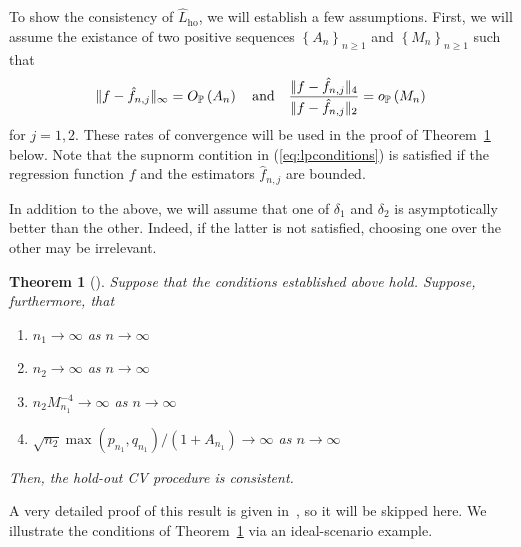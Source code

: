 \documentclass[11pt, letter paper]{article}
\newcommand{\1}{\mathmybb{1}}
\newtheorem{theorem}[proposition]{Theorem}
\newcommand{\0}{\emptyset}
\newcommand{\prob}{\mathbb{P}}
\newcommand{\paren}[1]{\left(#1 \right)}
\newcommand{\set}[1]{\left\{ #1 \right\}}
\newcommand{\norm}[1]{|\hspace{-1pt}|#1 |\hspace{-1pt}|}
\newcommand{\ho}{\hat{L}_{\mathrm{ho}}}
\newcommand{\op}[1]{o_{\prob}\paren{#1}}
\newcommand{\Op}[1]{O_{\prob}\paren{#1}}
\newcommand{\fhat}[2]{\hat{f}_{#1, #2}}
\begin{document}
To show the consistency of \(\ho\), we will establish a few assumptions. First, we will assume the existance of two positive sequences \(\set{A_{n}}_{n\geq1}\) and \(\set{M_{n}}_{n\geq1}\) such that 
\begin{equation}\label{eq:lpconditions}
\norm{f-\fhat{n}{j}}_{\infty} = \Op{A_{n}}\quad\text{and}\quad\frac{\norm{f-\fhat{n}{j}}_{4}}{\norm{f-\fhat{n}{j}}_{2}} = \op{M_{n}}
\end{equation}
for \(j=1,2\). These rates of convergence will be used in the proof of Theorem~\ref{thm:yangth1} below. Note that the supnorm contition in (\ref{eq:lpconditions}) is satisfied if the regression function \(f\) and the estimators \(\fhat{n}{j}\) are bounded.

In addition to the above, we will assume that one of \(\delta_{1}\) and \(\delta_{2}\) is asymptotically better than the other. Indeed, if the latter is not satisfied, choosing one over the other may be irrelevant.

\begin{theorem}[\cite{yang_2007}]\label{thm:yangth1}
    Suppose that the conditions established above hold. Suppose, furthermore, that
    \begin{enumerate}
        \item \(n_{1}\to\infty\) as \(n\to\infty\)
        \item \(n_{2}\to\infty\) as \(n\to\infty\)
        \item \(n_{2}M_{n_{1}}^{-4} \to \infty\) as \(n\to\infty\)
        \item \(\sqrt{n_{2}}\max(p_{n_{1}}, q_{n_{1}})/\paren{1+A_{n_{1}}}\to\infty \) as \(n\to\infty\)
    \end{enumerate}
    Then, the hold-out CV procedure is consistent.
\end{theorem}

A very detailed proof of this result is given in~\textcite{yang_2007}, so it will be skipped here. We illustrate the conditions of Theorem~\ref{thm:yangth1} via an ideal-scenario example.
\end{document}

